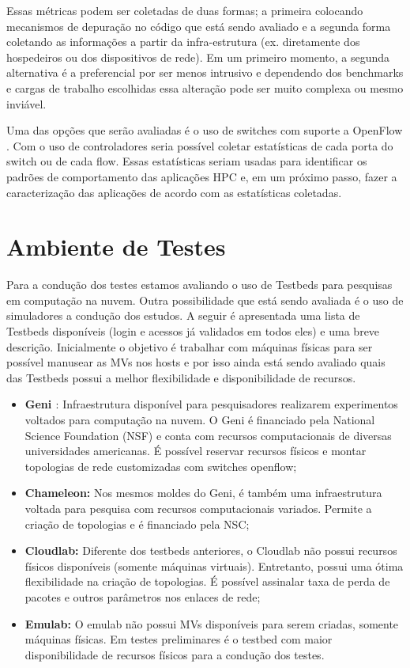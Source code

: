\documentclass[10pt, conference, compsocconf]{IEEEtran}
\begin{document}
Essas métricas podem ser coletadas de duas formas; a primeira colocando mecanismos de depuração no código que está sendo avaliado e a segunda forma coletando as informações a partir da infra-estrutura (ex. diretamente dos hospedeiros ou dos dispositivos de rede). Em um primeiro momento, a segunda alternativa é a preferencial por ser menos intrusivo e dependendo dos benchmarks e cargas de trabalho escolhidas essa alteração pode ser muito complexa ou mesmo inviável.

Uma das opções que serão avaliadas é o uso de switches com suporte a OpenFlow \cite{McKeown:2008}. Com o uso de controladores seria possível coletar estatísticas de cada porta do switch ou de cada flow. Essas estatísticas seriam usadas para identificar os padrões de comportamento das aplicações HPC e, em um próximo passo, fazer a caracterização das aplicações de acordo com as estatísticas coletadas.

\section{Ambiente de Testes}
Para a condução dos testes estamos avaliando o uso de Testbeds para pesquisas em computação na nuvem. Outra possibilidade que está sendo avaliada é o uso de simuladores a condução dos estudos. A seguir é apresentada uma lista de Testbeds disponíveis (login e acessos já validados em todos eles) e uma breve descrição. Inicialmente o objetivo é trabalhar com máquinas físicas para ser possível manusear as MVs nos hosts e por isso ainda está sendo avaliado quais das Testbeds possui a melhor flexibilidade e disponibilidade de recursos.

\begin{itemize}
 \item \textbf{Geni \cite{Elliott:2009}}: Infraestrutura disponível para pesquisadores realizarem experimentos voltados para computação na nuvem. O Geni é financiado pela National Science Foundation (NSF) e conta com recursos computacionais de diversas universidades americanas. É possível reservar recursos físicos e montar topologias de rede customizadas com switches openflow;
 \item \textbf{Chameleon:} Nos mesmos moldes do Geni, é também uma infraestrutura voltada para pesquisa com recursos computacionais variados. Permite a criação de topologias e é financiado pela NSC;
 \item \textbf{Cloudlab:} Diferente dos testbeds anteriores, o Cloudlab não possui recursos físicos disponíveis (somente máquinas virtuais). Entretanto, possui uma ótima flexibilidade na criação de topologias. É possível assinalar taxa de perda de pacotes e outros parâmetros nos enlaces de rede;
 \item \textbf{Emulab:} O emulab não possui MVs disponíveis para serem criadas, somente máquinas físicas. Em testes preliminares é o testbed com maior disponibilidade de recursos físicos para a condução dos testes.
\end{itemize}
\end{document}

